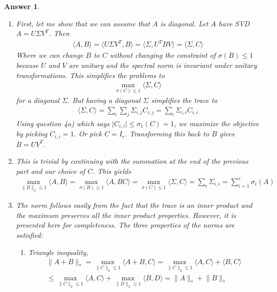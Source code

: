 \documentclass[12pt]{article}
\theoremstyle{colon}
\newtheorem*{answer}{Answer}
\begin{document}
\begin{answer}
  \

  \begin{enumerate}[label=\alph*)]
    \item First, let me show that we can assume that $A$ is diagonal. Let $A$ have SVD $A = U \Sigma V^T$. Then
      \begin{gather*}
        \langle A, B \rangle = \langle U \Sigma V^T, B \rangle = \langle \Sigma, U^T B V \rangle = \langle \Sigma, C \rangle
      \end{gather*}
      Where we can change $B$ to $C$ without changing the constraint of $\sigma(B) \leq 1$ because $U$ and $V$ are unitary and the spectral norm is invariant under unitary transformations. This simplifies the problems to
      \begin{gather*}
        \max_{\sigma(C) \leq 1} \langle \Sigma, C \rangle
      \end{gather*}
      for a diagonal $\Sigma$. But having a diagonal $\Sigma$ simplifies the trace to
      \begin{gather*}
        \langle \Sigma, C \rangle = \sum_i \sum_j \Sigma_{i,j} C_{i,j} = \sum_i \Sigma_{i,i} C_{i,i}
      \end{gather*}
      Using question 4a) which says $\lvert C_{i,i} \rvert \leq \sigma_1(C) = 1$, we maximize the objective by picking $C_{i,i} = 1$. Or pick $C = I_r$. Transforming this back to $B$ gives $B = U V^T$.

    \item This is trivial by continuing with the summation at the end of the previous part and our choice of $C$. This yields
      \begin{gather*}
        \max_{\lVert B \rVert_2 \leq 1} \langle A, B \rangle = \max_{\sigma(B) \leq 1} \langle A, BC \rangle = \max_{\sigma(C) \leq 1} \langle \Sigma, C \rangle = \sum_i \Sigma_{i,i} = \sum_{i=1}^r \sigma_i(A)
      \end{gather*}
    \item The norm follows easily from the fact that the trace is an inner product and the maximum preserves all the inner product properties. However, it is presented here for completeness. The three properties of the norms are satisfied:

      \begin{enumerate}[label=\roman*)]
        \item Triangle inequality,
          \begin{gather*}
            \lVert A + B \rVert_* = \max_{\lVert C \rVert_2 \leq 1} \langle A + B, C \rangle = \max_{\lVert C \rVert_2 \leq 1} \langle A, C \rangle + \langle B, C \rangle \\
            \leq \max_{\lVert C \rVert_2 \leq 1} \langle A, C \rangle + \max_{\lVert D \rVert_2 \leq 1} \langle B, D \rangle = \lVert A \rVert_* + \lVert B \rVert_*
          \end{gather*}


\end{enumerate}
\end{enumerate}
\end{answer}
\end{document}
